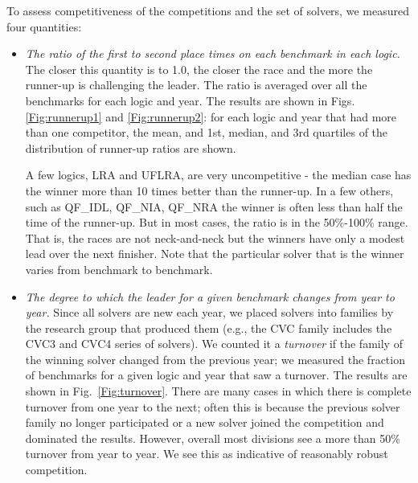 \documentclass{eptcs}
\begin{document}
To assess competitiveness of the competitions and the set of solvers, we measured four quantities:
\begin{itemize}
\item {\em The ratio of the first to second place times on each benchmark in each logic.} The closer this quantity is to 1.0, the closer the race and the more the runner-up is challenging the leader. The ratio is averaged over all the benchmarks for each logic and year. The results are shown in Figs. \ref{Fig:runnerup1} and \ref{Fig:runnerup2}: for each logic and year that had more than one competitor, the mean, and 1st, median, and 3rd quartiles of the distribution of runner-up ratios are shown. 

A few logics, LRA and UFLRA, are very uncompetitive - the median case has the winner more than 10 times better than the runner-up. In a few others, such as QF\_IDL, QF\_NIA, QF\_NRA the winner is often less than half the time of the runner-up. But in most cases, the ratio is in the 50\%-100\% range. That is, the races are not neck-and-neck but the winners have only a modest lead over the next finisher. Note that the particular solver that is the winner varies from benchmark to benchmark.

\item {\em The degree to which the leader for a given benchmark changes from year to year.} Since all solvers are new each year, we placed solvers into families by the research group that produced them (e.g., the CVC family includes the CVC3 and CVC4 series of solvers). We counted it a {\em turnover} if the family of the winning solver changed from the previous year; we measured the fraction of benchmarks for a given logic and year that saw a turnover. The results are shown in 
Fig.~\ref{Fig:turnover}. There are many cases in which there is complete turnover from one year to the next; often this is because the previous solver family no longer participated or a new solver joined the competition and dominated the results. However, overall most
divisions see a more than 50\% turnover from year to year. We see this as indicative of reasonably robust competition.




\end{itemize}
\end{document}
